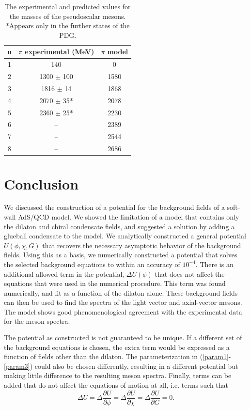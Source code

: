 \documentclass[aps,prd,12pt,nofootinbib]{revtex4}
\newcommand{\be}{\begin{equation}}
\newcommand{\ee}{\end{equation}}
\begin{document}
\begin{table}[htb]
\label{tabPion}
\begin{center}
\begin{tabular}{| c || c | c  |}
\hline
n & $\pi$ experimental (MeV) & $\pi$ model \\
\hline
1 & 140 &				0 \\
2 & 1300 $\pm$ 100 & 	1580 \\
3 & 1816 $\pm$ 14&		1868 \\
4 & 2070 $\pm$ 35* & 	2078 \\ 
5 & 2360 $\pm$ 25* &	2230	\\
6 & -- & 				2389 \\
7 & -- & 				2544 \\
8 & -- &				2686 \\
\hline
\end{tabular}
\caption{The experimental and predicted values for the masses of the pseudoscalar mesons.
*Appears only in the further states of the PDG.}
\end{center}

\end{table}


\section{Conclusion}

We discussed the construction of a potential for the background fields of a soft-wall AdS/QCD model. 
We showed the limitation of a model that contains only the dilaton and chiral condensate fields, and suggested a solution by adding a glueball condensate to the model.
We analytically constructed a general potential $U(\phi,\chi,G)$ that recovers the necessary asymptotic behavior of the background fields.
Using this as a basis, we numerically constructed a potential that solves the selected background equations to within an accuracy of $10^{-4}$. 
There is an additional allowed term in the  potential, $\Delta U(\phi)$ that does not affect the equations that were used in the numerical procedure. 
This term was found numerically, and fit as a function of the dilaton alone.
These background fields can then be used to find the spectra of the light vector and axial-vector mesons.
The model shows good phenomenological agreement with the experimental data for the meson spectra.

The potential as constructed is not guaranteed to be unique.
If a different set of the background equations is chosen, the extra term would be expressed as a function of fields other than the dilaton.
The parameterization in (\ref{param1}-\ref{param3}) could also be chosen differently, resulting in a different potential but making little difference to the resulting meson spectra.
Finally, terms can be added that do not affect the equations of motion at all, i.e. terms such that 
\be
\Delta U = \Delta \frac{\partial U}{\partial \phi} = \Delta \frac{\partial U}{\partial \chi} = \Delta \frac{\partial U}{\partial G} =0.
\ee
\end{document}
